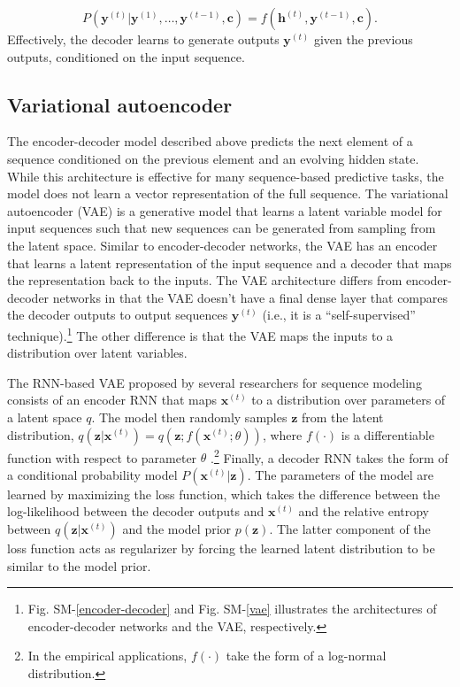 \documentclass[hidelinks,12pt]{article}
\begin{document}
\begin{equation}
P (\mathbf{y}^{(t)} | \mathbf{y}^{(1)}, \ldots, \mathbf{y}^{(t-1)}, \mathbf{c}) =  f \left( \mathbf{h}^{(t)}, \mathbf{y}^{(t-1)}, \mathbf{c} \right).
\end{equation}  Effectively, the decoder learns to generate outputs $\mathbf{y}^{(t)}$ given the previous outputs, conditioned on the input sequence. 

\subsection{Variational autoencoder}

The encoder-decoder model described above predicts the next element of a sequence conditioned on the previous element and an evolving hidden state. While this architecture is effective for many sequence-based predictive tasks, the model does not learn a vector representation of the full sequence. The variational autoencoder (VAE) \citep{kingma2013auto} is a generative model that learns a latent variable model for input sequences such that new sequences can be generated from sampling from the latent space. Similar to encoder-decoder networks, the VAE has an encoder that learns a latent representation of the input sequence and a decoder that maps the representation back to the inputs. The VAE architecture differs from encoder-decoder networks in that the VAE doesn't have a final dense layer that compares the decoder outputs to output sequences $\mathbf{y}^{(t)}$ (i.e., it is a ``self-supervised'' technique).\footnote{Fig. SM-\ref{encoder-decoder} and Fig. SM-\ref{vae} illustrates the architectures of encoder-decoder networks and the VAE, respectively.} The other difference is that the VAE maps the inputs to a distribution over latent variables. 

The RNN-based VAE proposed by several researchers \citep{fabius2014variational, chung2015recurrent,bowman2015generating} for sequence modeling consists of an encoder RNN that maps $\mathbf{x}^{(t)}$ to a distribution over parameters of a latent space $q$. The model then randomly samples $\mathbf{z}$ from the latent distribution, $q(\mathbf{z} | \mathbf{x}^{(t)}) = q (\mathbf{z}; f(\mathbf{x}^{(t)}; \theta))$, where $f(\cdot)$ is a differentiable function with respect to parameter $\theta$ \citep[pp. 699][]{goodfellow2016deep}.\footnote{In the empirical applications, $f(\cdot)$ take the form of a log-normal distribution.} Finally, a decoder RNN takes the form of a conditional probability model $P (\mathbf{x}^{(t)} | \mathbf{z})$. The parameters of the model are learned by maximizing the loss function, which takes the difference between the log-likelihood between the decoder outputs and $\mathbf{x}^{(t)}$ and the relative entropy between  $q(\mathbf{z} | \mathbf{x}^{(t)})$ and the model prior $p (\mathbf{z})$. The latter component of the loss function acts as regularizer by forcing the learned latent distribution to be similar to the model prior. 
\end{document}
